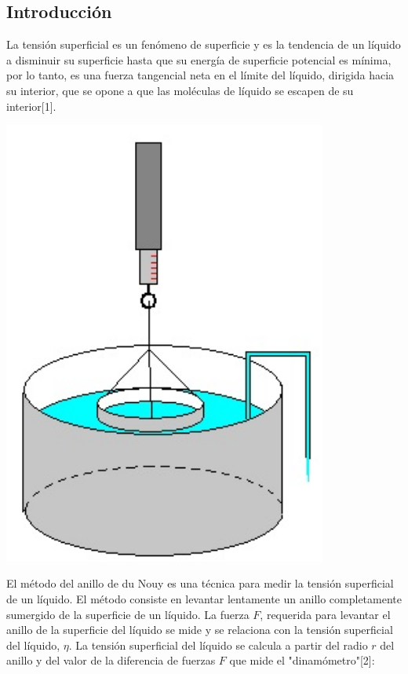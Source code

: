 \documentclass[DIV=calc, paper=a4, fontsize=11pt]{scrartcl}
\newenvironment{Figura}
  {\par\medskip\noindent\minipage{\linewidth}}
  {\endminipage\par\medskip}
\begin{document}
\begin{multicols}{2}




\section*{Introducción}

La tensión superficial es un fenómeno de superficie y es la tendencia de un líquido a disminuir su superficie hasta que su energía de superficie potencial es mínima, por lo tanto, es una fuerza tangencial neta en el límite del líquido, dirigida hacia su interior, que se opone a que las moléculas de líquido se escapen de su interior[1].

\begin{Figura}
\centering
    \includegraphics[width=0.8\textwidth]{Captura.PNG}
    \label{fig}
\end{Figura}

El método del anillo de du Nouy es una técnica para medir la tensión superficial de un líquido. El método consiste en levantar lentamente un anillo completamente sumergido de la superficie de un líquido. La fuerza $F$, requerida para levantar el anillo de la superficie del líquido se mide y se relaciona con la tensión superficial del líquido, $\eta$. La tensión superficial del líquido se calcula a partir del radio $r$ del anillo y del valor de la diferencia de fuerzas $F$ que mide el "dinamómetro"[2]:



\end{multicols}
\end{document}
